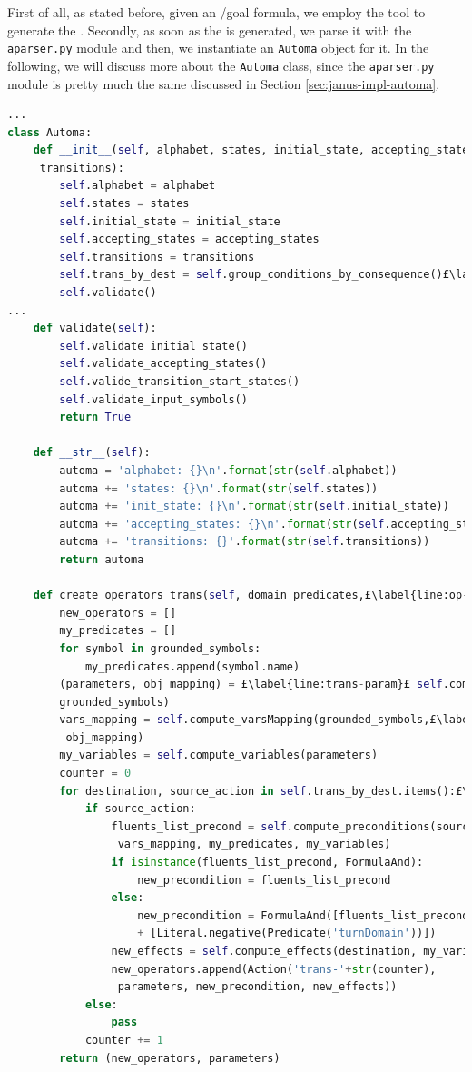 First of all, as stated before, given an \LTLf/\PLTL goal formula, we employ the \LTLfToDFA tool to generate the \DFA. Secondly, as soon as the \DFA is generated, we parse it with the \texttt{aparser.py} module and then, we instantiate an \texttt{Automa} object for it. In the following, we will discuss more about the \texttt{Automa} class, since the \texttt{aparser.py} module is pretty much the same discussed in Section \ref{sec:janus-impl-automa}.

\begin{lstlisting}[language=Python, style=Python, escapechar = £,  label={code:fond-automa}, caption={The \texttt{Automa} class.}]
...
class Automa:
    def __init__(self, alphabet, states, initial_state, accepting_states,
     transitions):
        self.alphabet = alphabet
        self.states = states
        self.initial_state = initial_state
        self.accepting_states = accepting_states
        self.transitions = transitions
        self.trans_by_dest = self.group_conditions_by_consequence()£\label{line:trans-by-dest}£
        self.validate()
...
    def validate(self):
        self.validate_initial_state()
        self.validate_accepting_states()
        self.valide_transition_start_states()
        self.validate_input_symbols()
        return True

    def __str__(self):
        automa = 'alphabet: {}\n'.format(str(self.alphabet))
        automa += 'states: {}\n'.format(str(self.states))
        automa += 'init_state: {}\n'.format(str(self.initial_state))
        automa += 'accepting_states: {}\n'.format(str(self.accepting_states))
        automa += 'transitions: {}'.format(str(self.transitions))
        return automa

    def create_operators_trans(self, domain_predicates,£\label{line:op-trans}£ grounded_symbols):
        new_operators = []
        my_predicates = []
        for symbol in grounded_symbols:
            my_predicates.append(symbol.name)
        (parameters, obj_mapping) = £\label{line:trans-param}£ self.compute_parameters(domain_predicates, 
        grounded_symbols)
        vars_mapping = self.compute_varsMapping(grounded_symbols,£\label{line:trans-vars-map}£
         obj_mapping)
        my_variables = self.compute_variables(parameters)
        counter = 0
        for destination, source_action in self.trans_by_dest.items():£\label{line:trans-prec-eff}£
            if source_action:
                fluents_list_precond = self.compute_preconditions(source_action,
                 vars_mapping, my_predicates, my_variables)
                if isinstance(fluents_list_precond, FormulaAnd):
                    new_precondition = fluents_list_precond
                else:
                    new_precondition = FormulaAnd([fluents_list_precond] 
                    + [Literal.negative(Predicate('turnDomain'))])
                new_effects = self.compute_effects(destination, my_variables)
                new_operators.append(Action('trans-'+str(counter),
                 parameters, new_precondition, new_effects))
            else:
                pass
            counter += 1
        return (new_operators, parameters)


\end{lstlisting}
